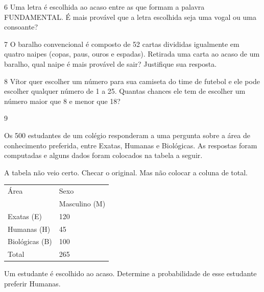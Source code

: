 \begin{mdframed}[linewidth=2pt,linecolor=salmao,roundcorner=2pt]
\begin{escolha}
\num{6} Uma letra é escolhida ao acaso entre as que formam a palavra
FUNDAMENTAL. É mais provável que a letra escolhida seja uma vogal ou uma consoante?

\begin{mdframed}[linewidth=2pt,linecolor=salmao,roundcorner=2pt]



\end{mdframed}

\num{7} O baralho convencional é composto de 52 cartas divididas igualmente em quatro
naipes (copas, paus, ouros e espadas). Retirada uma carta ao acaso de um baralho,
qual naipe é mais provável de sair? Justifique sua resposta.


\num{8} Vítor quer escolher um número para sua camiseta do time de futebol e ele
pode escolher qualquer número de 1 a 25. Quantas chances ele tem de
escolher um número maior que 8 e menor que 18?

\begin{mdframed}[linewidth=2pt,linecolor=salmao,roundcorner=2pt]


\end{mdframed}

\num{9}

Os 500 estudantes de um colégio responderam a uma pergunta sobre a
área de conhecimento preferida, entre Exatas, Humanas e
Biológicas. As respostas foram computadas e alguns dados foram colocados
na tabela a seguir.

\Paulo A tabela não veio certo. Checar o original. Mas não colocar a coluna de total.
\begin{longtable}[]{@{}ll@{}}
\toprule
Área & Sexo\tabularnewline
& Masculino (M)\tabularnewline
Exatas (E) & 120\tabularnewline
Humanas (H) & 45\tabularnewline
Biológicas (B) & 100\tabularnewline
Total & 265\tabularnewline
\bottomrule
\end{longtable}

Um estudante é escolhido ao acaso. Determine a probabilidade de esse
estudante preferir Humanas.


\end{escolha}
\end{mdframed}
